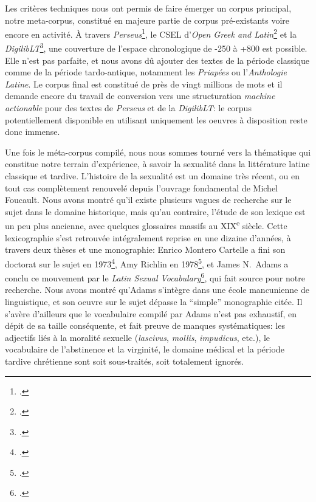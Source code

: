 Les critères techniques nous ont permis de faire émerger un corpus principal, notre meta-corpus, constitué en majeure partie de corpus pré-existants voire encore en activité. À travers \textit{Perseus}\footcite{perseus_latinLit}, le CSEL d'\textit{Open Greek and Latin}\footcite{csel_latinlit} et la \textit{DigilibLT}\footcite{digiliblt}, une couverture de l'espace chronologique de -250 à +800 est possible. Elle n'est pas parfaite, et nous avons dû ajouter des textes de la période classique comme de la période tardo-antique, notamment les \textit{Priapées} ou l'\textit{Anthologie Latine}. Le corpus final est constitué de près de vingt millions de mots et il demande encore du travail de conversion vers une structuration \textit{machine actionable} pour des textes de \textit{Perseus} et de la \textit{DigilibLT}: le corpus potentiellement disponible en utilisant uniquement les oeuvres à disposition reste donc immense.

Une fois le méta-corpus compilé, nous nous sommes tourné vers la thématique qui constitue notre terrain d'expérience, à savoir la sexualité dans la littérature latine classique et tardive. L'histoire de la sexualité est un domaine très récent, ou en tout cas complètement renouvelé depuis l'ouvrage fondamental de Michel Foucault. Nous avons montré qu'il existe plusieurs vagues de recherche sur le sujet dans le domaine historique, mais qu'au contraire, l'étude de son lexique est un peu plus ancienne, avec quelques glossaires massifs au XIX\textsuperscript{e} siècle. Cette lexicographie s'est retrouvée intégralement reprise en une dizaine d'années, à travers deux thèses et une monographie: Enrico Montero Cartelle a fini son doctorat sur le sujet en 1973\footcite{montero_cartelle_aspectos_1973}, Amy Richlin en 1978\footcite{richlin_sexual_1978}, et James N.~Adams a conclu ce mouvement par le \textit{Latin Sexual Vocabulary}\footcite{adams}, qui fait source pour notre recherche. Nous avons montré qu'Adams s'intègre dans une école mancunienne de linguistique, et son oeuvre sur le sujet dépasse la \enquote{simple} monographie citée. Il s'avère d'ailleurs que le vocabulaire compilé par Adams n'est pas exhaustif, en dépit de sa taille conséquente, et fait preuve de manques systématiques: les adjectifs liés à la moralité sexuelle (\textit{lascivus}, \textit{mollis}, \textit{impudicus}, etc.), le vocabulaire de l'abstinence et la virginité, le domaine médical et la période tardive chrétienne sont soit sous-traités, soit totalement ignorés.

